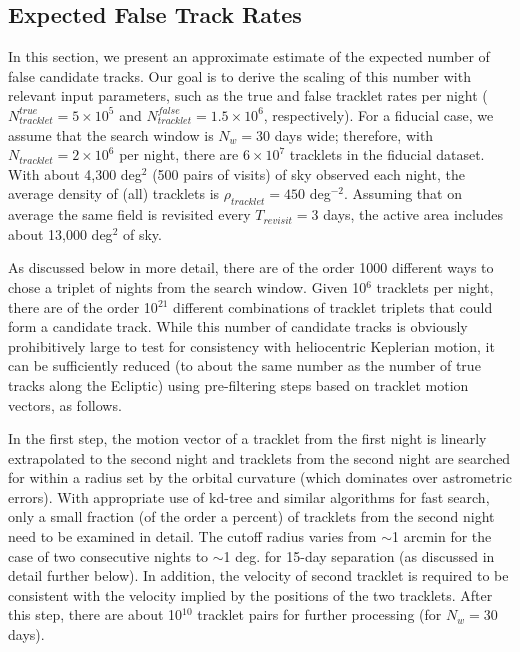 \subsection{Expected False Track Rates \label{sec:tracks} }

In this section, we present an approximate estimate of the expected number of false candidate tracks.
Our goal is to derive the scaling of this number with relevant input parameters, such as the true and false
tracklet rates per night ($N_{tracklet}^{true}=5\times10^5$ and $N_{tracklet}^{false}=1.5\times10^6$, respectively).
For a fiducial case, we assume that the search window is $N_w= 30$ days wide;  therefore, with $N_{tracklet} = 2\times10^6$
per night, there are $6\times10^7$ tracklets in the fiducial dataset. With about 4,300 deg$^2$ (500 pairs of visits)
of sky observed each night, the average density of (all) tracklets is $\rho_{tracklet} = 450$ deg$^{-2}$. Assuming
that on average the same field is revisited every $T_{revisit}=3$ days, the active area includes about 13,000 deg$^2$
of sky.

As discussed below in more detail, there are of the order 1000 different ways to chose a triplet of nights
from the search window. Given 10$^6$ tracklets per night, there are of the order
10$^{21}$ different combinations of tracklet triplets that could form a candidate track.
While this number of candidate tracks is obviously prohibitively large to test for consistency
with heliocentric Keplerian motion, it can be sufficiently reduced (to about the same number
as the number of true tracks along the Ecliptic) using pre-filtering steps based on tracklet motion
vectors, as follows.

In the first step, the motion vector of a tracklet from the first night is linearly extrapolated
to the second night and tracklets from the second night are searched for within a radius set
by the orbital curvature (which dominates over astrometric errors). With appropriate use of
kd-tree and similar algorithms for fast search, only a small fraction (of the order a percent)
of tracklets from the second night need to be examined in detail. The cutoff radius varies
from $\sim$1 arcmin for the case of two consecutive nights to $\sim$1 deg. for 15-day separation
(as discussed in detail further below). In addition, the velocity of second tracklet is required
to be consistent with the velocity implied by the positions of the two tracklets. After
this step, there are about 10$^{10}$ tracklet pairs for further processing (for $N_w=30$
days).

